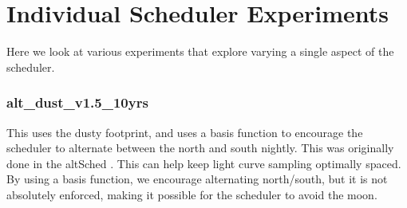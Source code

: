 

\section{Individual Scheduler Experiments}

Here we look at various experiments that explore varying a single aspect of the scheduler.







\subsubsection{alt\_dust\_v1.5\_10yrs}

This uses the dusty footprint, and uses a basis function to encourage the scheduler to alternate between the north and south nightly. This was originally done in the altSched \citep{Rothchild19}. This can help keep light curve sampling optimally spaced. By using a basis function, we encourage alternating north/south, but it is not absolutely enforced, making it possible for the scheduler to avoid the moon.



